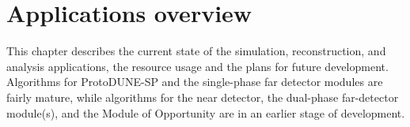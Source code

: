 \documentclass[../main-v1.tex]{subfiles}
\begin{document}
\chapter{Applications overview}
\label{ch:appl}

This chapter describes the current state of the simulation, reconstruction, and analysis applications, the resource usage and the plans for future development.  Algorithms for ProtoDUNE-SP and the single-phase far detector modules are fairly mature, while algorithms for the near detector, the dual-phase far-detector module(s), and the Module of Opportunity are in an earlier stage of development.

\cleardoublepage







\end{document}
